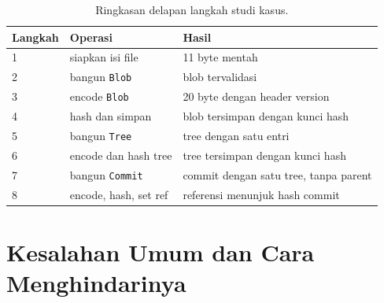 \documentclass[11pt,a4paper]{article}
\begin{document}
\begin{table}[H]
	\centering
	\caption{Ringkasan delapan langkah studi kasus.}
	\label{tab:case}
	\footnotesize
	\begin{tabularx}{\textwidth}{l X X}
		\toprule
		Langkah & Operasi                & Hasil                                 \\
		\midrule
		1       & siapkan isi file       & 11 byte mentah                        \\
		2       & bangun \texttt{Blob}   & blob tervalidasi                      \\
		3       & encode \texttt{Blob}   & 20 byte dengan header version         \\
		4       & hash dan simpan        & blob tersimpan dengan kunci hash      \\
		5       & bangun \texttt{Tree}   & tree dengan satu entri                \\
		6       & encode dan hash tree   & tree tersimpan dengan kunci hash      \\
		7       & bangun \texttt{Commit} & commit dengan satu tree, tanpa parent \\
		8       & encode, hash, set ref  & referensi menunjuk hash commit        \\
		\bottomrule
	\end{tabularx}
\end{table}

\section{Kesalahan Umum dan Cara Menghindarinya}
\end{document}
